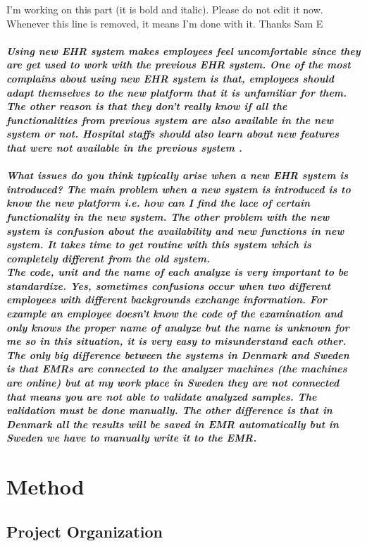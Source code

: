 \documentclass[14pt]{article}
\begin{document}
\begin{description}
{\LARGE I'm working on this part (it is bold and italic). Please do not edit it now. Whenever this line is removed, it means I'm done with it. Thanks Sam E}
\textbf{\emph{
\\
\\
Using new \gls{EHR} system makes employees feel uncomfortable since they are get used to work with the previous \gls{EHR} system. One of the most complains about using new \gls{EHR} system is that, employees should adapt themselves to the new platform that it is unfamiliar for them. The other reason is that they don’t really know if all the functionalities from previous system are also available in the new system or not. Hospital staffs should also learn about new features that were not available in the previous system \cite{FarzinYazdi}.
\\
\\
What issues do you think typically arise when a new EHR system is introduced?
The main problem when a new system is introduced is to know the new platform i.e. how can I find the lace of certain functionality in the new system. The other problem with the new system is confusion about the availability and new functions in new system. It takes time to get routine with this system which is completely different from the old system.
\\
The code, unit and the name of each analyze is very important to be standardize.
Yes, sometimes confusions occur when two different employees with different backgrounds exchange information. For example an employee doesn't know the code of the examination and only knows the proper name of analyze but the name is unknown for me so in this situation, it is very easy to misunderstand each other.
The only big difference between the systems in Denmark and Sweden is that EMRs are connected to the analyzer machines (the machines are online) but at my work place in Sweden they are not connected that means you are not able to validate analyzed samples. The validation must be done manually. The other difference is that in Denmark all the results will be saved in EMR automatically but in Sweden we have
to manually write it to the EMR.
}}
\end{description}

\newpage

\section{Method}
\label{sec:Method}

\subsection{Project Organization}
\end{document}
